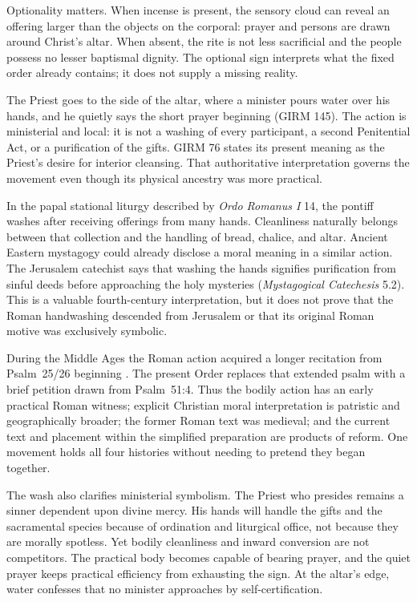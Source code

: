 Optionality matters. When incense is present, the sensory cloud can reveal an offering larger than the objects on the corporal: prayer and persons are drawn around Christ's altar. When absent, the rite is not less sacrificial and the people possess no lesser baptismal dignity. The optional sign interprets what the fixed order already contains; it does not supply a missing reality.


The Priest goes to the side of the altar, where a minister pours water over his hands, and he quietly says the short prayer beginning  (GIRM 145). The action is ministerial and local: it is not a washing of every participant, a second Penitential Act, or a purification of the gifts. GIRM 76 states its present meaning as the Priest's desire for interior cleansing. That authoritative interpretation governs the movement even though its physical ancestry was more practical.

In the papal stational liturgy described by \emph{Ordo Romanus I} 14, the pontiff washes after receiving offerings from many hands. Cleanliness naturally belongs between that collection and the handling of bread, chalice, and altar. Ancient Eastern mystagogy could already disclose a moral meaning in a similar action. The Jerusalem catechist says that washing the hands signifies purification from sinful deeds before approaching the holy mysteries (\emph{Mystagogical Catechesis} 5.2). This is a valuable fourth-century interpretation, but it does not prove that the Roman handwashing descended from Jerusalem or that its original Roman motive was exclusively symbolic.

During the Middle Ages the Roman action acquired a longer recitation from Psalm~25/26 beginning . The present Order replaces that extended psalm with a brief petition drawn from Psalm~51:4. Thus the bodily action has an early practical Roman witness; explicit Christian moral interpretation is patristic and geographically broader; the former Roman text was medieval; and the current text and placement within the simplified preparation are products of reform. One movement holds all four histories without needing to pretend they began together.

The wash also clarifies ministerial symbolism. The Priest who presides remains a sinner dependent upon divine mercy. His hands will handle the gifts and the sacramental species because of ordination and liturgical office, not because they are morally spotless. Yet bodily cleanliness and inward conversion are not competitors. The practical body becomes capable of bearing prayer, and the quiet prayer keeps practical efficiency from exhausting the sign. At the altar's edge, water confesses that no minister approaches by self-certification.

